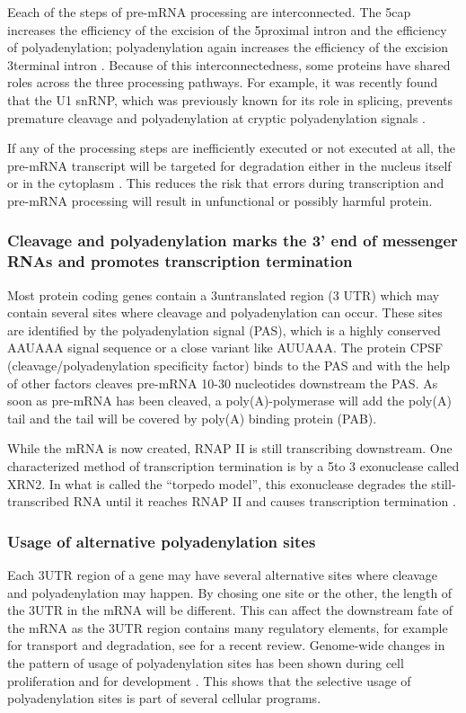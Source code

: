 Eeach of the steps of pre-mRNA processing are interconnected. The 5\p cap
increases the efficiency of the excision of the 5\p proximal
intron and the efficiency of polyadenylation; polyadenylation again increases
the efficiency of the excision 3\p terminal intron
\cite{proudfoot_integrating_2002}. Because of this interconnectedness, some
proteins have shared roles across the three processing pathways. For example,
it was recently found that the U1 snRNP, which was previously known for its
role in splicing, prevents premature cleavage and polyadenylation at cryptic
polyadenylation signals \cite{kaida_u1_2010}.

If any of the processing steps are inefficiently executed or not executed at
all, the pre-mRNA transcript will be targeted for degradation either in the
nucleus itself or in the cytoplasm \cite{doma_rna_2007}. This reduces the risk
that errors during transcription and pre-mRNA processing will result in
unfunctional or possibly harmful protein.

\subsubsection{Cleavage and polyadenylation marks the 3' end of messenger RNAs
and promotes transcription termination}
Most protein coding genes contain a 3\p untranslated region (3\p
UTR) which may contain several sites where cleavage and polyadenylation can
occur. These sites are identified by the polyadenylation signal (PAS), which is
a highly conserved AAUAAA signal sequence or a close variant like AUUAAA. The
protein CPSF (cleavage/polyadenylation specificity factor) binds to the PAS and
with the help of other factors cleaves pre-mRNA 10-30 nucleotides downstream
the PAS. As soon as pre-mRNA has been cleaved, a poly(A)-polymerase will add
the poly(A) tail and the tail will be covered by poly(A) binding protein (PAB).

While the mRNA is now created, RNAP II is still transcribing downstream. One
characterized method of transcription termination is by a 5\p to 3\p
exonuclease called XRN2. In what is called the ``torpedo model'', this
exonuclease degrades the still-transcribed RNA until it reaches RNAP II and
causes transcription termination \cite{kuehner_unravelling_2011}.

\subsubsection{Usage of alternative polyadenylation sites}
Each 3\p UTR region of a gene may have several alternative sites where cleavage
and polyadenylation may happen. By chosing one site or the other, the length of
the 3\p UTR in the mRNA will be different. This can affect the
downstream fate of the mRNA as the 3\p UTR region contains many regulatory
elements, for example for transport and degradation, see
\cite{lutz_alternative_2011} for a recent review. Genome-wide changes in the
pattern of usage of polyadenylation sites has been shown during cell
proliferation \cite{sandberg_proliferating_2008} and for development
\cite{hilgers_neural-specific_2011, ji_progressive_2009}. This shows that the
selective usage of polyadenylation sites is part of several cellular programs.

